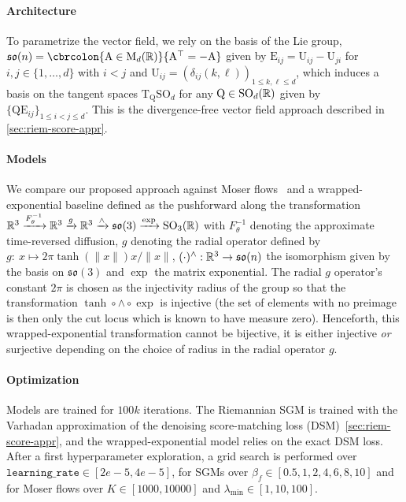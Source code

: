 \paragraph{Architecture}
To parametrize the vector field, we rely on the basis of the Lie group, \(\mathfrak{so}(n)= \cbrcolon{\mathrm{A} \in \mathrm{M}_d(\R)}{\mathrm{A}^\top = -\mathrm{A} }\) given by \(\mathrm{E}_{ij} = \mathrm{U}_{ij} - \mathrm{U}_{ji}\) for \(i, j \in \{1, \dots, d\}\) with \(i < j\) and \(\mathrm{U}_{ij} = (\delta_{ij}(k,\ell))_{1\leq k, \ell \leq d}\), which induces a basis on the tangent spaces \(\mathrm{T}_{\mathrm{Q}} \mathrm{SO}_d\) for any \(\mathrm{Q} \in \mathrm{SO}_d(\mathbb{R})\) given by \(\{\mathrm{Q} \mathrm{E}_{ij}\}_{1 \leq i<j \leq d}\).
This is the divergence-free vector field approach described in \cref{sec:riem-score-appr}.

\paragraph{Models}
We compare our proposed approach against Moser flows~\parencite{rozen2021moser} and a wrapped-exponential baseline \parencite{falorsi2019reparameterizing} defined as the pushforward along the transformation \(\mathbb{R}^3 \xrightarrow[]{F^{-1}_\theta} \mathbb{R}^3 \xrightarrow[]{g} \mathbb{R}^3 \xrightarrow[]{\wedge} \mathfrak{so}(3) \xrightarrow[]{\exp} \mathrm{SO}_3(\mathbb{R})\) with \(F^{-1}_\theta\) denoting the approximate time-reversed diffusion, \(g\) denoting the radial operator defined by \(g: \ x \mapsto 2\pi \tanh(\|x\|) x / \|x\|\), \((\cdot)^{\wedge} : \mathbb{R}^3 \rightarrow \mathfrak{so}(n)\) the isomorphism given by the basis on \(\mathfrak{so}(3)\) and \(\exp\) the matrix exponential.
The radial \(g\) operator's constant \(2\pi\) is chosen as the injectivity radius of the group so that the transformation \(\tanh \circ \wedge \circ \exp\) is injective (the set of elements with no preimage is then only the cut locus which is known to have measure zero).
Henceforth, this wrapped-exponential transformation cannot be bijective, it is either injective \emph{or} surjective depending on the choice of radius in the radial operator \(g\).

\paragraph{Optimization}
Models are trained for \(100k\) iterations.
The Riemannian SGM is trained with the Varhadan approximation of the denoising score-matching loss (DSM)~\cref{sec:riem-score-appr}, and the wrapped-exponential model relies on the exact DSM loss.
After a first hyperparameter exploration, a grid search is performed over \(\texttt{learning\_rate} \in [2e-5, 4e-5]\), for SGMs over \(\beta_f \in [0.5, 1, 2, 4, 6, 8, 10]\) and for Moser flows over \(K \in [1000, 10000]\) and \(\lambda_{\min} \in [1, 10, 100]\).
